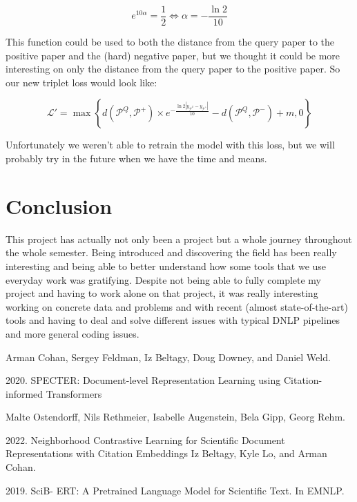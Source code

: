 \documentclass[conference]{IEEEtran}
\begin{document}
$$e^{10\alpha} = \frac 12 \Longleftrightarrow \alpha = -\frac{\ln2}{10}$$

This function could be used to both the distance from the query paper to the positive paper and the (hard) negative paper, but we thought it could be more interesting on only the distance from the query paper to the positive paper. So our new triplet loss would look like:

$$\mathcal L' = \max\left\{d\left(\mathcal P^Q, \mathcal P^+\right)\times e^{-\frac{\ln2|y_\mathcal{P^Q}-y_{\mathcal P^+}|}{10}} - d\left(\mathcal P^Q, \mathcal P^-\right) + m, 0\right\}$$

Unfortunately we weren't able to retrain the model with this loss, but we will probably try in the future when we have the time and means.

\section{Conclusion}

This project has actually not only been a project but a whole journey throughout the whole semester. Being introduced and discovering the field has been really interesting and being able to better understand how some tools that we use everyday work was gratifying. Despite not being able to fully complete my project and having to work alone on that project, it was really interesting working on concrete data and problems and with recent (almost state-of-the-art) tools and having to deal and solve different issues with typical DNLP pipelines and more general coding issues.

\begin{thebibliography}{00}
Arman Cohan, Sergey Feldman, Iz Beltagy, Doug Downey, and Daniel Weld. 

2020. SPECTER: Document-level Representation Learning using Citation-informed Transformers

 Malte Ostendorff, Nils Rethmeier, Isabelle Augenstein, Bela Gipp, Georg Rehm.

2022. Neighborhood Contrastive Learning for Scientific Document Representations with Citation Embeddings
 Iz Beltagy, Kyle Lo, and Arman Cohan.

2019. SciB- ERT: A Pretrained Language Model for Scientific Text. In EMNLP.

\end{thebibliography}
\vspace{12pt}
\end{document}
